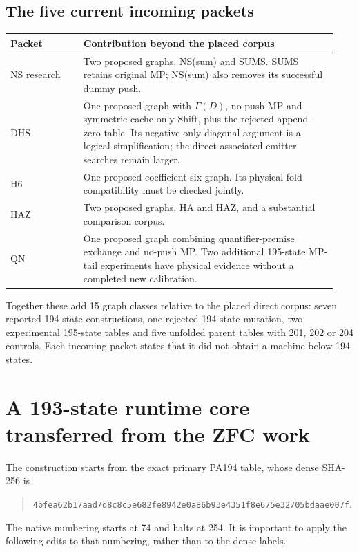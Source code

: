 \documentclass[11pt,letterpaper]{article}
\begin{document}
\subsection{The five current incoming packets}
\begin{longtable}{@{}p{0.21\linewidth}p{0.73\linewidth}@{}}
\toprule Packet & Contribution beyond the placed corpus\\\midrule\endhead
NS research & Two proposed graphs, NS(sum) and SUMS. SUMS retains original MP; NS(sum) also removes its successful dummy push.\\[4pt]
DHS & One proposed graph with $\Gamma(D)$, no-push MP and symmetric cache-only Shift, plus the rejected append-zero table. Its negative-only diagonal argument is a logical simplification; the direct associated emitter searches remain larger.\\[4pt]
H6 & One proposed coefficient-six graph. Its physical fold compatibility must be checked jointly.\\[4pt]
HAZ & Two proposed graphs, HA and HAZ, and a substantial comparison corpus.\\[4pt]
QN & One proposed graph combining quantifier-premise exchange and no-push MP. Two additional 195-state MP-tail experiments have physical evidence without a completed new calibration.\\
\bottomrule
\end{longtable}
Together these add 15 graph classes relative to the placed direct corpus:
seven reported 194-state constructions, one rejected 194-state mutation,
two experimental 195-state tables and five unfolded parent tables with
201, 202 or 204 controls. Each incoming packet states that it did not obtain
a machine below 194 states.



\section{A 193-state runtime core transferred from the ZFC work}
\label{sec:runtime}

The construction starts from the exact primary PA194 table, whose dense
SHA-256 is
\begin{quote}\small\nolinkurl{4bfea62b17aad7d8c8c5e682fe8942e0a86b93e4351f8e675e32705bdaae007f}.\end{quote}
The native numbering starts at 74 and halts at 254. It is important to apply
the following edits to that numbering, rather than to the dense labels.
\end{document}

